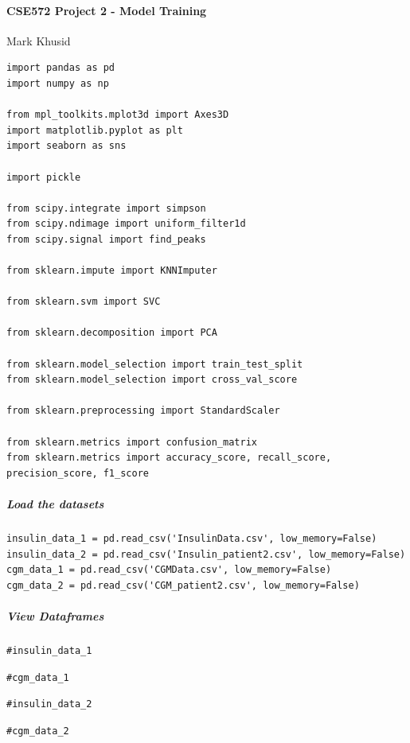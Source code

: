 \paragraph{CSE572 Project 2 - Model Training}

Mark Khusid

\begin{verbatim}
import pandas as pd
import numpy as np

from mpl_toolkits.mplot3d import Axes3D
import matplotlib.pyplot as plt
import seaborn as sns

import pickle

from scipy.integrate import simpson
from scipy.ndimage import uniform_filter1d
from scipy.signal import find_peaks

from sklearn.impute import KNNImputer

from sklearn.svm import SVC

from sklearn.decomposition import PCA

from sklearn.model_selection import train_test_split
from sklearn.model_selection import cross_val_score

from sklearn.preprocessing import StandardScaler

from sklearn.metrics import confusion_matrix
from sklearn.metrics import accuracy_score, recall_score, precision_score, f1_score
\end{verbatim}

\subparagraph{Load the datasets}

\begin{verbatim}
insulin_data_1 = pd.read_csv('InsulinData.csv', low_memory=False)
insulin_data_2 = pd.read_csv('Insulin_patient2.csv', low_memory=False)
cgm_data_1 = pd.read_csv('CGMData.csv', low_memory=False)
cgm_data_2 = pd.read_csv('CGM_patient2.csv', low_memory=False)
\end{verbatim}

\subparagraph{View Dataframes}

\begin{verbatim}
#insulin_data_1
\end{verbatim}

\begin{verbatim}
#cgm_data_1
\end{verbatim}

\begin{verbatim}
#insulin_data_2
\end{verbatim}

\begin{verbatim}
#cgm_data_2
\end{verbatim}

